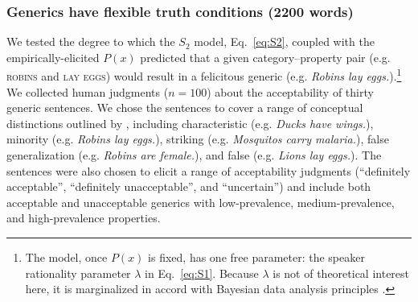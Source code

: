\documentclass[10pt,letterpaper]{article}
\newcommand{\ndg}[1]{\textcolor{Green}{[ndg: #1]}}
\begin{document}
\subsubsection*{Generics have flexible truth conditions (2200 words)} 

We tested the degree to which the $S_2$ model, Eq.~\ref{eq:S2}, coupled with the empirically-elicited $P(x)$ predicted that a given category--property pair (e.g. \textsc{robins} and \textsc{lay eggs}) would result in a felicitous generic (e.g. \emph{Robins lay eggs.}).\footnote{The model, once $P(x)$ is fixed, has one free parameter: the speaker rationality parameter $\lambda$ in Eq.~\ref{eq:S1}. Because $\lambda$ is not of theoretical interest here, it is marginalized in accord with Bayesian data analysis principles \cite{LW2014}. } 
We collected human judgments ($n=100$) about the acceptability of thirty generic sentences. 
We chose the sentences to cover a range of conceptual distinctions outlined by , including characteristic (e.g. \emph{Ducks have wings.}), minority (e.g. \emph{Robins lay eggs.}), striking (e.g. \emph{Mosquitos carry malaria.}), false generalization (e.g. \emph{Robins are female.}), and false (e.g. \emph{Lions lay eggs.}).
The sentences were also chosen to elicit a range of acceptability judgments (``definitely acceptable'', ``definitely unacceptable'', and ``uncertain'') and include both acceptable and unacceptable generics with low-prevalence, medium-prevalence, and high-prevalence properties.
%

\end{document}
